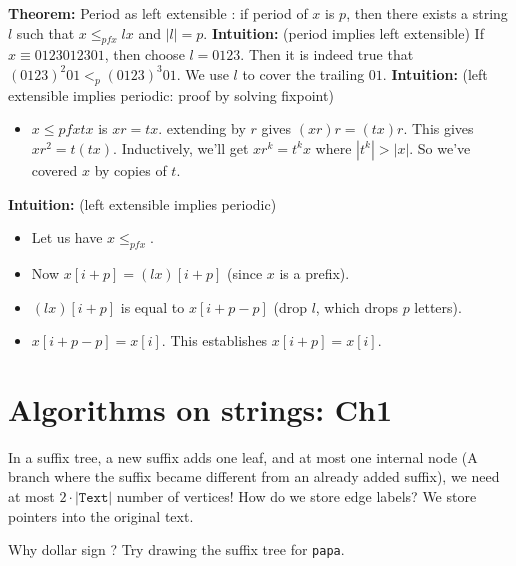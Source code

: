 \documentclass{report}
\newcommand*{\theorem}{\leavevmode\newline \textbf{Theorem: } }
\newcommand*{\intuition}{\leavevmode\newline \textbf{Intuition: } }
\begin{document}
\theorem Period as left extensible : if period of $x$ is $p$, then there exists a string $l$ such that $x \leq_{pfx} lx$ and $|l|=p$.
\intuition (period implies left extensible) If $x \equiv 0123012301$, then choose $l=0123$. Then it is indeed true that $(0123)^2 01 <_p (0123)^3 01$.  We use $l$ to cover the trailing $01$.
\intuition (left extensible implies periodic: proof by solving fixpoint)
\begin{itemize}
    \item $x \leq{pfx} tx$ is $xr = tx$. extending by $r$ gives $(xr)r = (tx)r$. This gives $xr^2 = t(tx)$. Inductively, we'll
        get $xr^k = t^kx$ where $|t^k| > |x|$. So we've covered $x$ by copies of $t$.
\end{itemize}
\intuition (left extensible implies periodic)
\begin{itemize}
\item Let us have $x \leq_{pfx}$.
\item Now $x[i+p] = (lx)[i+p]$ (since $x$ is a prefix). 
\item $(lx)[i+p]$ is equal to $x[i+p-p]$ (drop $l$, which drops $p$ letters). 
\item $x[i+p-p] = x[i]$. This establishes $x[i+p] = x[i]$.
\end{itemize}

\chapter{Algorithms on strings: Ch1}

In a suffix tree, a new suffix adds one leaf, and at most one internal node (A branch where the suffix became different from an already added suffix),
we need at most $2 \cdot |\texttt{Text}|$ number of vertices! How do we store edge labels? We store pointers into the original text.

Why dollar sign ? Try drawing the suffix tree for \texttt{papa}.
\end{document}
